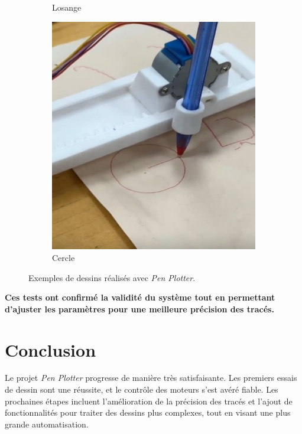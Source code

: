 \documentclass[12pt,a4paper]{article}
\begin{document}
\begin{figure}[h]
\begin{subfigure}{0.3\textwidth}
        \caption{Losange}
    \end{subfigure}
    \hspace{0.05\textwidth}
    \begin{subfigure}{0.3\textwidth}
        \centering
        \includegraphics[width=\linewidth]{image3}
        \caption{Cercle}
    \end{subfigure}
    \caption{Exemples de dessins réalisés avec \textit{Pen Plotter}.}
    \label{fig:shapes}
\end{figure}

\noindent \textbf{Ces tests ont confirmé la validité du système tout en permettant d'ajuster les paramètres pour une meilleure précision des tracés.}

\section{Conclusion}
\textsf{Le projet \textit{Pen Plotter} progresse de manière très satisfaisante. Les premiers essais de dessin sont une réussite, et le contrôle des moteurs s'est avéré fiable. Les prochaines étapes incluent l’amélioration de la précision des tracés et l'ajout de fonctionnalités pour traiter des dessins plus complexes, tout en visant une plus grande automatisation.}
\end{document}
